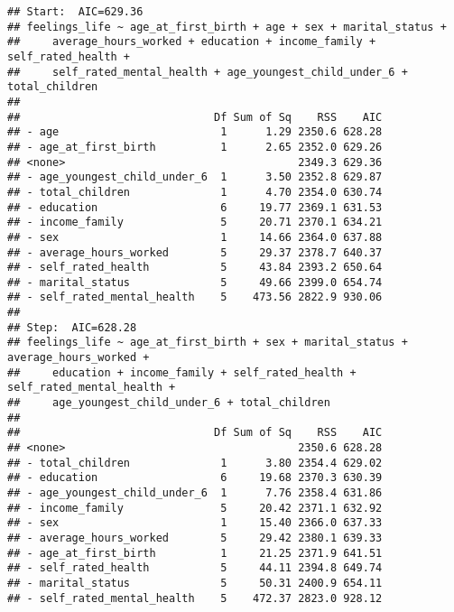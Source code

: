 \documentclass[
]{article}
\begin{document}
\begin{verbatim}
## Start:  AIC=629.36
## feelings_life ~ age_at_first_birth + age + sex + marital_status + 
##     average_hours_worked + education + income_family + self_rated_health + 
##     self_rated_mental_health + age_youngest_child_under_6 + total_children
## 
##                              Df Sum of Sq    RSS    AIC
## - age                         1      1.29 2350.6 628.28
## - age_at_first_birth          1      2.65 2352.0 629.26
## <none>                                    2349.3 629.36
## - age_youngest_child_under_6  1      3.50 2352.8 629.87
## - total_children              1      4.70 2354.0 630.74
## - education                   6     19.77 2369.1 631.53
## - income_family               5     20.71 2370.1 634.21
## - sex                         1     14.66 2364.0 637.88
## - average_hours_worked        5     29.37 2378.7 640.37
## - self_rated_health           5     43.84 2393.2 650.64
## - marital_status              5     49.66 2399.0 654.74
## - self_rated_mental_health    5    473.56 2822.9 930.06
## 
## Step:  AIC=628.28
## feelings_life ~ age_at_first_birth + sex + marital_status + average_hours_worked + 
##     education + income_family + self_rated_health + self_rated_mental_health + 
##     age_youngest_child_under_6 + total_children
## 
##                              Df Sum of Sq    RSS    AIC
## <none>                                    2350.6 628.28
## - total_children              1      3.80 2354.4 629.02
## - education                   6     19.68 2370.3 630.39
## - age_youngest_child_under_6  1      7.76 2358.4 631.86
## - income_family               5     20.42 2371.1 632.92
## - sex                         1     15.40 2366.0 637.33
## - average_hours_worked        5     29.42 2380.1 639.33
## - age_at_first_birth          1     21.25 2371.9 641.51
## - self_rated_health           5     44.11 2394.8 649.74
## - marital_status              5     50.31 2400.9 654.11
## - self_rated_mental_health    5    472.37 2823.0 928.12
\end{verbatim}
\end{document}

